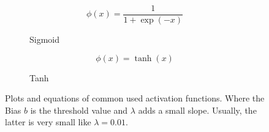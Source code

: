 \begin{figure}
	\begin{subfigure}{.5\textwidth}
		\centering
		
		\begin{equation*}
		\phi(x) = \frac{1}{1+\exp(-x)}
		\end{equation*}
		\caption{Sigmoid}
		\label{fig:sigmoid-activation}
	\end{subfigure}%
	\begin{subfigure}{.5\textwidth}
		\centering
		
		\begin{equation*}
		\phi(x) = \tanh(x)
		\end{equation*}
		\caption{Tanh}
		\label{fig:tanh-activation}
	\end{subfigure}
	\caption[Common activation functions]{Plots and equations of common used activation functions. Where the Bias $b$ is the threshold value and $\lambda$ adds a small slope. Usually, the latter is very small like $\lambda=0.01$.}
	\label{fig:activation-functions}
\end{figure}